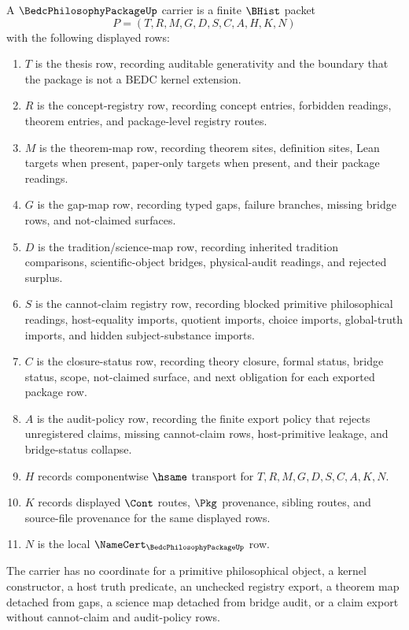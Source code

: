 \begin{definition}
\label{def:bedc-philosophy-package-namecert-carrier}
A $\BedcPhilosophyPackageUp$ carrier is a finite $\BHist$ packet
$$
P=(T,R,M,G,D,S,C,A,H,K,N)
$$
with the following displayed rows:
\begin{enumerate}
\item $T$ is the thesis row, recording auditable generativity and the boundary that the package is not a BEDC kernel extension.
\item $R$ is the concept-registry row, recording concept entries, forbidden readings, theorem entries, and package-level registry routes.
\item $M$ is the theorem-map row, recording theorem sites, definition sites, Lean targets when present, paper-only targets when present, and their package readings.
\item $G$ is the gap-map row, recording typed gaps, failure branches, missing bridge rows, and not-claimed surfaces.
\item $D$ is the tradition/science-map row, recording inherited tradition comparisons, scientific-object bridges, physical-audit readings, and rejected surplus.
\item $S$ is the cannot-claim registry row, recording blocked primitive philosophical readings, host-equality imports, quotient imports, choice imports, global-truth imports, and hidden subject-substance imports.
\item $C$ is the closure-status row, recording theory closure, formal status, bridge status, scope, not-claimed surface, and next obligation for each exported package row.
\item $A$ is the audit-policy row, recording the finite export policy that rejects unregistered claims, missing cannot-claim rows, host-primitive leakage, and bridge-status collapse.
\item $H$ records componentwise $\hsame$ transport for $T,R,M,G,D,S,C,A,K,N$.
\item $K$ records displayed $\Cont$ routes, $\Pkg$ provenance, sibling routes, and source-file provenance for the same displayed rows.
\item $N$ is the local $\NameCert_{\BedcPhilosophyPackageUp}$ row.
\end{enumerate}
The carrier has no coordinate for a primitive philosophical object, a kernel constructor, a host truth predicate, an unchecked registry export, a theorem map detached from gaps, a science map detached from bridge audit, or a claim export without cannot-claim and audit-policy rows.
\end{definition}

